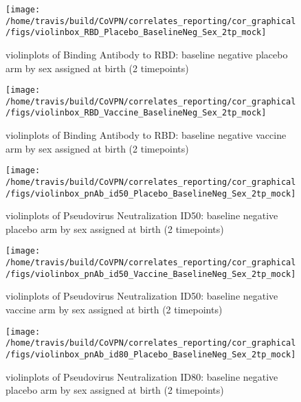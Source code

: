 \documentclass[]{book}
\theoremstyle{definition}
\theoremstyle{definition}
\theoremstyle{definition}
\newcommand{\1}{\mathbbm{1}}
\begin{document}
\clearpage
\begin{figure}[H]

{\centering \texttt{[image: /home/travis/build/CoVPN/correlates\_reporting/cor\_graphical/figs/violinbox\_RBD\_Placebo\_BaselineNeg\_Sex\_2tp\_mock]} 

}

\caption{violinplots of Binding Antibody to RBD: baseline negative placebo arm by sex assigned at birth (2 timepoints)}\label{fig:unnamed-chunk-165}
\end{figure}

\clearpage
\begin{figure}[H]

{\centering \texttt{[image: /home/travis/build/CoVPN/correlates\_reporting/cor\_graphical/figs/violinbox\_RBD\_Vaccine\_BaselineNeg\_Sex\_2tp\_mock]} 

}

\caption{violinplots of Binding Antibody to RBD: baseline negative vaccine arm by sex assigned at birth (2 timepoints)}\label{fig:unnamed-chunk-166}
\end{figure}

\clearpage
\begin{figure}[H]

{\centering \texttt{[image: /home/travis/build/CoVPN/correlates\_reporting/cor\_graphical/figs/violinbox\_pnAb\_id50\_Placebo\_BaselineNeg\_Sex\_2tp\_mock]} 

}

\caption{violinplots of Pseudovirus Neutralization ID50: baseline negative placebo arm by sex assigned at birth (2 timepoints)}\label{fig:unnamed-chunk-167}
\end{figure}

\clearpage
\begin{figure}[H]

{\centering \texttt{[image: /home/travis/build/CoVPN/correlates\_reporting/cor\_graphical/figs/violinbox\_pnAb\_id50\_Vaccine\_BaselineNeg\_Sex\_2tp\_mock]} 

}

\caption{violinplots of Pseudovirus Neutralization ID50: baseline negative vaccine arm by sex assigned at birth (2 timepoints)}\label{fig:unnamed-chunk-168}
\end{figure}

\clearpage
\begin{figure}[H]

{\centering \texttt{[image: /home/travis/build/CoVPN/correlates\_reporting/cor\_graphical/figs/violinbox\_pnAb\_id80\_Placebo\_BaselineNeg\_Sex\_2tp\_mock]} 

}

\caption{violinplots of Pseudovirus Neutralization ID80: baseline negative placebo arm by sex assigned at birth (2 timepoints)}\label{fig:unnamed-chunk-169}
\end{figure}
\end{document}
